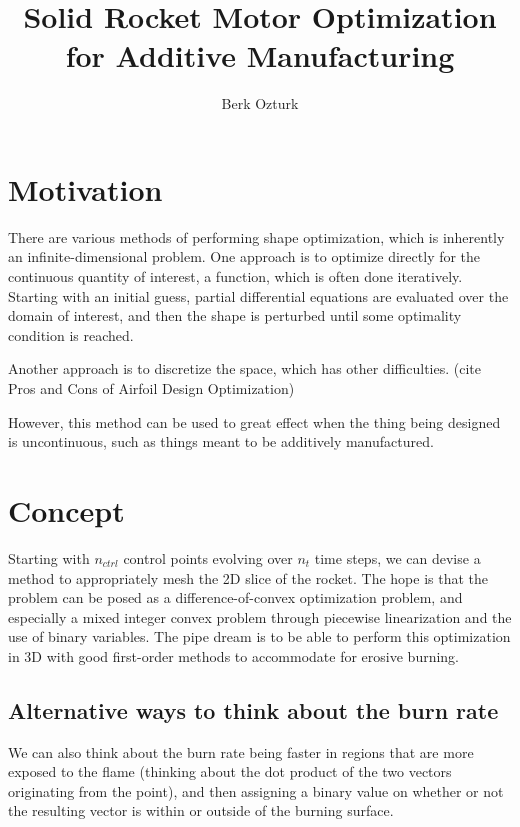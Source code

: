 \documentclass[12pt]{article}
\begin{document}
	
	
	
	\title{Solid Rocket Motor Optimization for Additive Manufacturing}
	\author{Berk Ozturk}
	
	\maketitle
	
	\section{Motivation}
	
There are various methods of performing shape optimization, which is inherently an infinite-dimensional problem. One approach is to optimize directly for the continuous quantity of interest, a function, which is often done iteratively. Starting with an initial guess, partial differential equations are evaluated over the domain of interest, and then the shape is perturbed until some optimality condition is reached. 

Another approach is to discretize the space, which has other difficulties.  (cite Pros and Cons of Airfoil Design Optimization)

However, this method can be used to great effect when the thing being designed is uncontinuous, such as things meant to be additively manufactured. 
	
	\section{Concept}
	
	Starting with $n_{ctrl}$ control points evolving over $n_t$ time steps, we can devise a method to appropriately mesh the 2D slice of the rocket. 
	The hope is that the problem can be posed as a difference-of-convex optimization problem, and especially a mixed integer convex problem through piecewise linearization and the use of binary variables. 
	The pipe dream is to be able to perform this optimization in 3D with good first-order methods to accommodate for erosive burning. 
	
	\subsection{Alternative ways to think about the burn rate}
	We can also think about the burn rate being faster in regions that are more exposed to the flame (thinking about the dot product of the two vectors originating from the point), and then assigning a binary value on whether or not the resulting vector is within or outside of the burning surface. 
\end{document}
